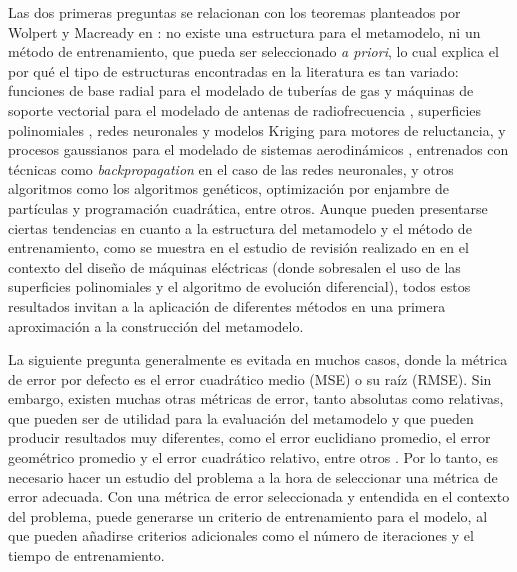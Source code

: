 Las dos primeras preguntas se relacionan con los teoremas planteados por Wolpert y Macready en \cite{NFLT}: no existe una estructura para el metamodelo, ni un método de entrenamiento, que pueda ser seleccionado \textit{a priori}, lo cual explica el por qué el tipo de estructuras encontradas en la literatura es tan variado: funciones de base radial para el modelado de tuberías de gas y máquinas de soporte vectorial para el modelado de antenas de radiofrecuencia \cite{koziel2013}, superficies polinomiales \cite{park2006}, redes neuronales \cite{mohammadi2015} y modelos Kriging \cite{song2011} para motores de reluctancia, y procesos gaussianos para el modelado de sistemas aerodinámicos \cite{zhou2007}, entrenados con técnicas como \textit{backpropagation} en el caso de las redes neuronales, y otros algoritmos como los algoritmos genéticos, optimización por enjambre de partículas y programación cuadrática, entre otros. Aunque pueden presentarse ciertas tendencias en cuanto a la estructura del metamodelo y el método de entrenamiento, como se muestra en el estudio de revisión realizado en \cite{duan2013} en el contexto del diseño de máquinas eléctricas (donde sobresalen el uso de las superficies polinomiales y el algoritmo de evolución diferencial), todos estos resultados invitan a la aplicación de diferentes métodos en una primera aproximación a la construcción del metamodelo.

La siguiente pregunta generalmente es evitada en muchos casos, donde la métrica de error por defecto es el error cuadrático medio (MSE) o su raíz (RMSE). Sin embargo, existen muchas otras métricas de error, tanto absolutas como relativas, que pueden ser de utilidad para la evaluación del metamodelo y que pueden producir resultados muy diferentes, como el error euclidiano promedio, el error geométrico promedio y el error cuadrático relativo, entre otros \cite{gorissen2010}. Por lo tanto, es necesario hacer un estudio del problema a la hora de seleccionar una métrica de error adecuada. Con una métrica de error seleccionada y entendida en el contexto del problema, puede generarse un criterio de entrenamiento para el modelo, al que pueden añadirse criterios adicionales como el número de iteraciones y el tiempo de entrenamiento.

